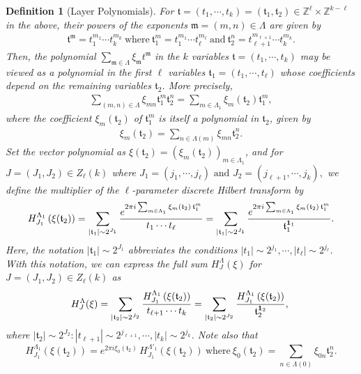 \documentclass[10pt,a4paper]{amsart}
\newtheorem{definition}{Definition}\numberwithin{definition}{section}
\numberwithin{equation}{section}
\begin{document}
\begin{definition}[Layer Polynomials]
For $\mathfrak{t}=(t_1,\cdots,t_k) = (\mathfrak{t}_1,\mathfrak{t}_2)\in \mathbb{Z}^\ell\times \mathbb{Z}^{k-\ell}$ in the above,  their powers of the exponents $\mathfrak{m}=(m,n)\in \Lambda$ are given by
\begin{align*}
\mathfrak{t}^{\mathfrak{m}}=t_1^{m_1}\cdots t_k^{m_k}\ \text{where}\ \mathfrak{t}_1^m=t_1^{m_1}\cdots t_\ell^{m_\ell}\ \text{and}\  \mathfrak{t}_2^n=t_{\ell+1}^{m_{\ell+1}}\cdots t_k^{m_k}.
\end{align*}
Then,  the polynomial $\sum_{\mathfrak{m}\in \Lambda}\xi_{\mathfrak{m}} t^{\mathfrak{m}}$  in the $k$ variables $\mathfrak{t}=(t_1,\cdots,t_k)$  may be viewed as a polynomial in the first $\ell$ variables $\mathfrak{t}_1=(t_1,\cdots,t_\ell)$ whose coefficients depend  on the remaining variables $\mathfrak{t}_2$. More precisely,
\begin{align*} 
 \sum_{(m,n)\in \Lambda} \xi_{mn} \mathfrak{t}_1^{m}\mathfrak{t}_2^n=\sum_{m\in \Lambda_{1}} \xi_{m}(\mathfrak{t}_2)  \mathfrak{t}_1^{m}, 
\end{align*}
where    the coefficient $ \xi_{m}(\mathfrak{t}_2)$ of \( \mathfrak{t}_1^{m}   \)   is itself a polynomial in $\mathfrak{t}_2$, given by 
\begin{align*}
 \xi_{m}(\mathfrak{t}_2) = \sum_{n\in \Lambda(m)} \xi_{mn}\mathfrak{t}_2^n.
\end{align*}
Set the vector polynomial
 as $\xi(\mathfrak{t}_2)=(\xi_{m}(\mathfrak{t}_2))_{m\in \Lambda_{1}}$, 
and for $J=(J_1,J_2)\in Z_\ell(k)$  where
$\text{$J_1=(j_1,\cdots,j_\ell)$ and $J_2=(j_{\ell+1},\cdots,j_k)$},$
we define the multiplier of the $\ell$-parameter discrete Hilbert transform by
\begin{align*}
H^{\Lambda_{1}}_{J_1}\left( \xi(\mathfrak{t}_2) \right) = \sum_{ |\mathfrak{t}_1| \sim 2^{J_1}} 
\frac{e^{2\pi i \sum_{m \in \Lambda_{1}} \xi_{m}(\mathfrak{t}_2) \, \mathfrak{t}_1^{m} }  }{t_1\cdots t_\ell}= \sum_{|\mathfrak{t}_1|\sim 2^{J_1} } 
\frac{e^{2\pi i \sum_{m \in \Lambda_{1}} \xi_{m}(\mathfrak{t}_2) \, \mathfrak{t}_1^{m} }  }{\mathfrak{t}_1^{{\bf 1}_1} }.
\end{align*}
Here, the notation  $|\mathfrak{t}_1|\sim 2^{J_1}$  abbreviates the conditions $ |t_1| \sim 2^{j_1},\cdots,|t_\ell|\sim 2^{j_{\ell}}$.
With this notation, we can express the full sum \( H^{\Lambda}_{J}(\xi) \) for \(J= (J_1,J_2) \in Z_\ell(k) \) as
\begin{align*}
H^{\Lambda}_J(\xi)=\sum_{| \mathfrak{t}_2 | \sim 2^{J_2}} 
\frac{  H^{\Lambda_{1}}_{J_1}\left( \xi(\mathfrak{t}_2) \right)}{t_{\ell+1}\cdots t_k}= \sum_{|\mathfrak{t}_2|\sim 2^{J_2}} 
\frac{  H^{\Lambda_{1}}_{J_1}\left( \xi(\mathfrak{t}_2) \right)}{\mathfrak{t}_{2}^{{\bf 1}_2}},\  
\end{align*}
where $|\mathfrak{t}_2|\sim 2^{J_2}:|t_{\ell+1}|\sim 2^{j_{\ell+1}},\cdots, |t_k|\sim 2^{j_k}$. Note also that
$$H^{\Lambda_{1}}_{J_1}\left( \xi(\mathfrak{t}_2) \right)=e^{2\pi i \xi_{0}(\mathfrak{t}_2)} \, H^{\Lambda'_{1}}_{J_1}\left( \xi(\mathfrak{t}_2) \right)\ \text{where}\ \xi_{0}(\mathfrak{t}_2) = \sum_{n \in \Lambda(0)} \xi_{0n} \mathfrak{t}_2^n.$$
\end{definition}
\end{document}
